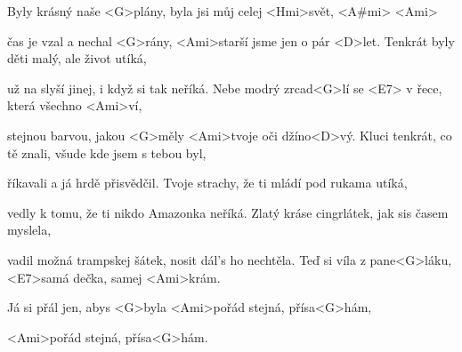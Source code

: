 
\zs
Byly krásný naše <G>plány,
{byla} jsi můj celej <Hmi>svět, <A#mi> <Ami>

čas je vzal a nechal <G>rány,
<Ami>starší jsme jen o pár <D>let.
\ks
\zs
Tenkrát byly děti malý, ale život utíká,

už na  slyší jinej, i když si tak neříká.
\ks
\zr
Nebe modrý zrcad<G>lí se <E7> v řece, která všechno <Ami>ví,

stejnou barvou, jakou <G>měly <Ami>tvoje oči džíno<D>vý.
\kr
\zs
Kluci tenkrát, co tě znali, všude kde jsem s tebou byl,

 říkavali a já hrdě přisvědčil.
\ks
\zs
Tvoje strachy, že ti mládí pod rukama utíká,

vedly k tomu, že ti nikdo Amazonka neříká.
\ks
\zr \kr
\zs
Zlatý kráse cingrlátek,
jak sis časem myslela,

vadil možná trampskej šátek,
nosit dál's ho nechtěla.
\ks
\zs
Teď si víla z pane<G>láku, <E7>samá dečka, samej <Ami>krám.

Já si přál jen, abys <G>byla <Ami>pořád stejná, přísa<G>hám,

<Ami>pořád stejná, přísa<G>hám.
\ks
\zr \kr
\kp







